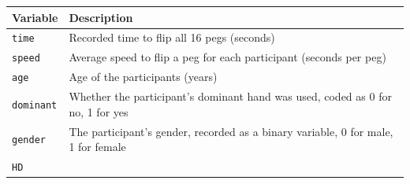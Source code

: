\documentclass[
]{report}
\begin{document}
\begin{longtable}[]{@{}ll@{}}
\toprule
\begin{minipage}[b]{0.22\columnwidth}\raggedright
\textbf{Variable}\strut
\end{minipage} & \begin{minipage}[b]{0.72\columnwidth}\raggedright
\textbf{Description}\strut
\end{minipage}\tabularnewline
\midrule
\endhead
\begin{minipage}[t]{0.22\columnwidth}\raggedright
\texttt{time}\strut
\end{minipage} & \begin{minipage}[t]{0.72\columnwidth}\raggedright
Recorded time to flip all 16 pegs (seconds)\strut
\end{minipage}\tabularnewline
\begin{minipage}[t]{0.22\columnwidth}\raggedright
\texttt{speed}\strut
\end{minipage} & \begin{minipage}[t]{0.72\columnwidth}\raggedright
Average speed to flip a peg for each participant (seconds per peg)\strut
\end{minipage}\tabularnewline
\begin{minipage}[t]{0.22\columnwidth}\raggedright
\texttt{age}\strut
\end{minipage} & \begin{minipage}[t]{0.72\columnwidth}\raggedright
Age of the participants (years)\strut
\end{minipage}\tabularnewline
\begin{minipage}[t]{0.22\columnwidth}\raggedright
\texttt{dominant}\strut
\end{minipage} & \begin{minipage}[t]{0.72\columnwidth}\raggedright
Whether the participant's dominant hand was used, coded as 0 for no, 1 for yes\strut
\end{minipage}\tabularnewline
\begin{minipage}[t]{0.22\columnwidth}\raggedright
\texttt{gender}\strut
\end{minipage} & \begin{minipage}[t]{0.72\columnwidth}\raggedright
The participant's gender, recorded as a binary variable, 0 for male, 1 for female\strut
\end{minipage}\tabularnewline
\begin{minipage}[t]{0.22\columnwidth}\raggedright
\texttt{HD}\strut
\end{minipage} & \begin{minipage}[t]{0.72\columnwidth}\raggedright

\end{minipage}
\end{longtable}
\end{document}
